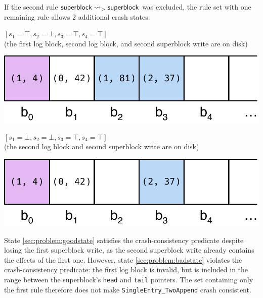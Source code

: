 \begin{example}
If the second rule $\deprule{\textsf{superblock}}{\textsf{superblock}}{>}$ was excluded,
the rule set with one remaining rule allows 2 additional crash states:
%
\begin{enumerate}[resume,label={\raisebox{3\baselineskip}[0pt][0pt]{(\arabic*)}},ref=(\arabic*)]
\item 
\begin{minipage}[b]{0.5\textwidth}
$[s_1 = \top, s_2 = \bot, s_3 = \top, s_4 = \top]$\\
(the first log block, second log block, and second superblock write are on disk) \\
\end{minipage}\quad%
\begin{minipage}{0.4\textwidth}
\vspace{-4em}
\includegraphics[width=\textwidth]{figs/sec3-6.pdf}
\end{minipage}
\label{sec:problem:goodstate}

\item 
\begin{minipage}[b]{0.5\textwidth}
$[s_1 = \bot, s_2 = \bot, s_3 = \top, s_4 = \top]$\\
(the second log block and second superblock write are on disk) \\
\end{minipage}\quad%
\begin{minipage}{0.4\textwidth}
\vspace{-4em}
\includegraphics[width=\textwidth]{figs/sec3-7.pdf}
\end{minipage}
\label{sec:problem:badstate}
\end{enumerate}
%
\vspace{-1.5em}
State \ref{sec:problem:goodstate} satisfies the crash-consistency predicate despite losing the first superblock write,
as the second superblock write already contains the effects of the first one.
However, state \ref{sec:problem:badstate} violates the crash-consistency predicate:
the first log block is invalid,
but is included in the range between the superblock's \texttt{head} and \texttt{tail} pointers.
The set containing only the first rule therefore does not make \texttt{SingleEntry_TwoAppend} crash consistent.
\end{example}
